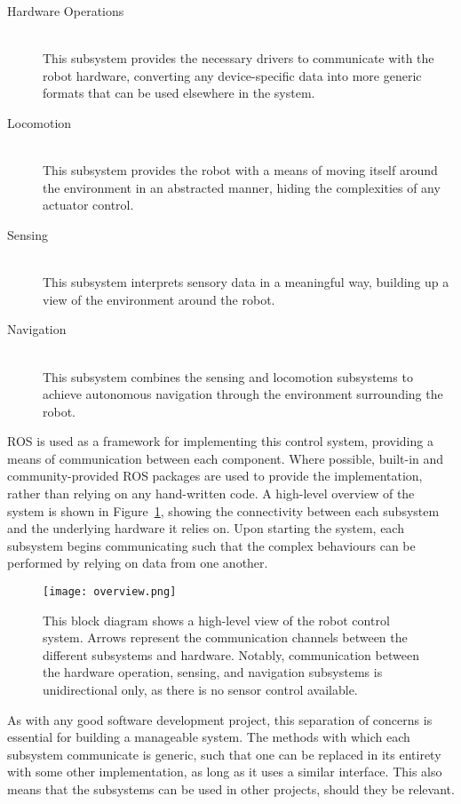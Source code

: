 \begin{description}
	\item[Hardware Operations] \hfill \\
	This subsystem provides the necessary drivers to communicate with the robot hardware, converting any device-specific data into more generic formats that can be used elsewhere in the system.

	\item[Locomotion] \hfill \\
	This subsystem provides the robot with a means of moving itself around the environment in an abstracted manner, hiding the complexities of any actuator control.

	\item[Sensing] \hfill \\
	This subsystem interprets sensory data in a meaningful way, building up a view of the environment around the robot.

	\item[Navigation] \hfill \\
	This subsystem combines the sensing and locomotion subsystems to achieve autonomous navigation through the environment surrounding the robot.
\end{description}

ROS is used as a framework for implementing this control system, providing a means of communication between each component. Where possible, built-in and community-provided ROS packages are used to provide the implementation, rather than relying on any hand-written code. A high-level overview of the system is shown in Figure~\ref{fig:overview}, showing the connectivity between each subsystem and the underlying hardware it relies on. Upon starting the system, each subsystem begins communicating such that the complex behaviours can be performed by relying on data from one another.

\begin{figure}[h]
	\centering
	\texttt{[image: overview.png]}
	\caption{This block diagram shows a high-level view of the robot control system. Arrows represent the communication channels between the different subsystems and hardware. Notably, communication between the hardware operation, sensing, and navigation subsystems is unidirectional only, as there is no sensor control available.}
	\label{fig:overview}
\end{figure}

As with any good software development project, this separation of concerns is essential for building a manageable system. The methods with which each subsystem communicate is generic, such that one can be replaced in its entirety with some other implementation, as long as it uses a similar interface. This also means that the subsystems can be used in other projects, should they be relevant.

